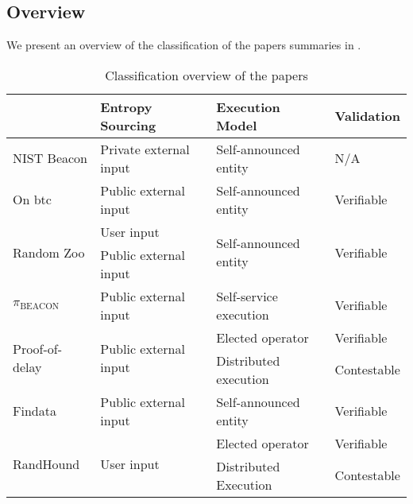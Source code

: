 \subsection{Overview}\label{sub:overview}
We present an overview of the classification of the papers summaries in .

\begin{table}[htbp]
    \centering
    \begin{tabularx}{\textwidth}{Xlll}
                               & \textbf{Entropy Sourcing}              & \textbf{Execution Model}               & \textbf{Validation}         \\\midrule
NIST Beacon                    & Private external input                 & Self-announced entity                  & N/A                         \\[1.5em]
On btc                         & Public external input                  & Self-announced entity                  & Verifiable                  \\[1.5em]
\multirow{2}{*}{Random Zoo}    & User input                             & \multirow{2}{*}{Self-announced entity} & \multirow{2}{*}{Verifiable} \\
                               & Public external input                  &                                        &                             \\[1.5em]
$\pi_\text{BEACON}$                   & Public external input                  & Self-service execution                 & Verifiable                  \\[1.5em]
\multirow{2}{*}{Proof-of-delay}& \multirow{2}{*}{Public external input} & Elected operator                       & Verifiable                  \\
                               &                                        & Distributed execution                  & Contestable                 \\[1.5em]
Findata                        & Public external input                  & Self-announced entity                  & Verifiable                  \\[1.5em]
\multirow{2}{*}{RandHound}     & \multirow{2}{*}{User input}            & Elected operator                       & Verifiable                  \\
                               &                                        & Distributed Execution                  & Contestable\\\bottomrule
    \end{tabularx}
    \caption{Classification overview of the papers}\label{tab:paper_overview}
\end{table}

